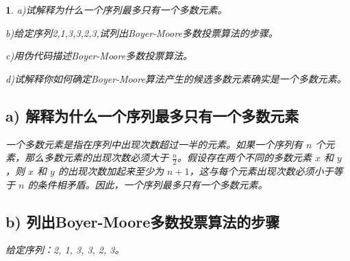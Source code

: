 \documentclass[UTF8]{report}
\theoremstyle{MyLineTheoremStyle} %
\theoremstyle{MyBlockTheoremStyle} %
\theoremstyle{MySubsubsectionStyle} %
\newtheorem{definition}{}
\begin{document}
\begin{definition}
a)试解释为什么一个序列最多只有一个多数元素。\par
b)给定序列2,1,3,3,2,3,试列出Boyer-Moore多数投票算法的步骤。\par
c)用伪代码描述Boyer-Moore多数投票算法。\par
d)试解释你如何确定Boyer-Moore算法产生的候选多数元素确实是一个多数元素。\par

\subsection{a) 解释为什么一个序列最多只有一个多数元素}

一个多数元素是指在序列中出现次数超过一半的元素。如果一个序列有 $n$ 个元素，那么多数元素的出现次数必须大于 $\frac{n}{2}$。假设存在两个不同的多数元素 $x$ 和 $y$，则 $x$ 和 $y$ 的出现次数加起来至少为 $n + 1$，这与每个元素出现次数必须小于等于 $n$ 的条件相矛盾。因此，一个序列最多只有一个多数元素。

\subsection{b) 列出Boyer-Moore多数投票算法的步骤}

给定序列：2, 1, 3, 3, 2, 3。


\end{definition}
\end{document}
